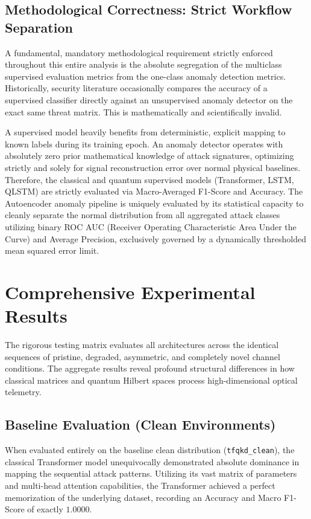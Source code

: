 \documentclass[10pt, journal, letterpaper, twocolumn]{IEEEtran}
\begin{document}
\subsection{Methodological Correctness: Strict Workflow Separation}
A fundamental, mandatory methodological requirement strictly enforced throughout this entire analysis is the absolute segregation of the multiclass supervised evaluation metrics from the one-class anomaly detection metrics. Historically, security literature occasionally compares the accuracy of a supervised classifier directly against an unsupervised anomaly detector on the exact same threat matrix. This is mathematically and scientifically invalid.

A supervised model heavily benefits from deterministic, explicit mapping to known labels during its training epoch. An anomaly detector operates with absolutely zero prior mathematical knowledge of attack signatures, optimizing strictly and solely for signal reconstruction error over normal physical baselines. Therefore, the classical and quantum supervised models (Transformer, LSTM, QLSTM) are strictly evaluated via Macro-Averaged F1-Score and Accuracy. The Autoencoder anomaly pipeline is uniquely evaluated by its statistical capacity to cleanly separate the normal distribution from all aggregated attack classes utilizing binary ROC AUC (Receiver Operating Characteristic Area Under the Curve) and Average Precision, exclusively governed by a dynamically thresholded mean squared error limit.

\section{Comprehensive Experimental Results}
The rigorous testing matrix evaluates all architectures across the identical sequences of pristine, degraded, asymmetric, and completely novel channel conditions. The aggregate results reveal profound structural differences in how classical matrices and quantum Hilbert spaces process high-dimensional optical telemetry.

\subsection{Baseline Evaluation (Clean Environments)}
When evaluated entirely on the baseline clean distribution (\texttt{tfqkd\_clean}), the classical Transformer model unequivocally demonstrated absolute dominance in mapping the sequential attack patterns. Utilizing its vast matrix of parameters and multi-head attention capabilities, the Transformer achieved a perfect memorization of the underlying dataset, recording an Accuracy and Macro F1-Score of exactly $1.0000$. 
\end{document}
